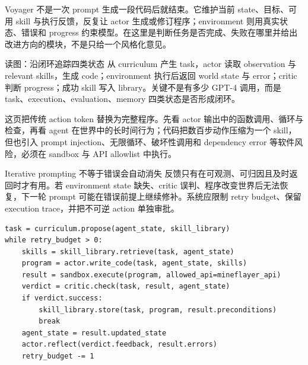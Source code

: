 Voyager 不是一次 prompt 生成一段代码后就结束。它维护当前 state、目标、可用 skill 与执行反馈，反复让 actor 生成或修订程序；environment 则用真实状态、错误和 progress 约束模型。在这里是判断任务是否完成、失败在哪里并给出改进方向的模块，不是只给一个风格化意见。


\begin{knowledgebox}{读图：沿闭环追踪四类状态}
从 curriculum 产生 task，actor 读取 observation 与 relevant skills，生成 code；environment 执行后返回 world state 与 error；critic 判断 progress；成功 skill 写入 library。关键不是有多少 GPT-4 调用，而是 task、execution、evaluation、memory 四类状态是否形成闭环。
\end{knowledgebox}


这页把传统 action token 替换为完整程序。先看 actor 输出中的函数调用、循环与检查，再看 agent 在世界中的长时间行为；代码把数百步动作压缩为一个 skill，但也引入 prompt injection、无限循环、破坏性调用和 dependency error 等软件风险，必须在 sandbox 与 API allowlist 中执行。


\begin{warningbox}{Iterative prompting 不等于错误会自动消失}
反馈只有在可观测、可归因且及时返回时才有用。若 environment state 缺失、critic 误判、程序改变世界后无法恢复，下一轮 prompt 可能在错误前提上继续修补。系统应限制 retry budget、保留 execution trace，并把不可逆 action 单独审批。
\end{warningbox}

\begin{lstlisting}[caption={Voyager 代码生成、执行反馈与 skill memory 的概念循环}]
task = curriculum.propose(agent_state, skill_library)
while retry_budget > 0:
    skills = skill_library.retrieve(task, agent_state)
    program = actor.write_code(task, agent_state, skills)
    result = sandbox.execute(program, allowed_api=mineflayer_api)
    verdict = critic.check(task, result, agent_state)
    if verdict.success:
        skill_library.store(task, program, result.preconditions)
        break
    agent_state = result.updated_state
    actor.reflect(verdict.feedback, result.errors)
    retry_budget -= 1
\end{lstlisting}

